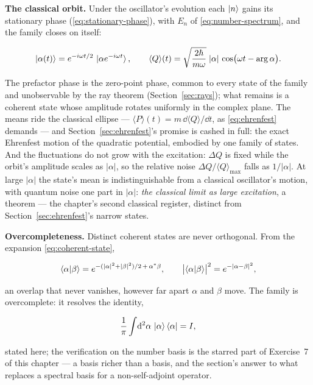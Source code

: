 \textbf{The classical orbit.} Under the oscillator's evolution each $\ket{n}$ gains its stationary phase (\eqref{eq:stationary-phase}), with $E_n$ of \eqref{eq:number-spectrum}, and the family closes on itself:
\begin{linenomath}
    \begin{equation}
        \ket{\alpha(t)} = e^{-i\omega t/2}\,\ket{\alpha e^{-i\omega t}},
        \qquad
        \langle Q\rangle(t) = \sqrt{\frac{2\hbar}{m\omega}}\;|\alpha|\,\cos\bigl(\omega t - \arg\alpha\bigr).
        \label{eq:coherent-evolution}
    \end{equation}
\end{linenomath}
The prefactor phase is the zero-point phase, common to every state of the family and unobservable by the ray theorem (Section~\ref{sec:rays}); what remains is a coherent state whose amplitude rotates uniformly in the complex plane. The means ride the classical ellipse --- $\langle P\rangle(t) = m\,\dd\langle Q\rangle/\dd t$, as \eqref{eq:ehrenfest} demands --- and Section~\ref{sec:ehrenfest}'s promise is cashed in full: the exact Ehrenfest motion of the quadratic potential, embodied by one family of states. And the fluctuations do not grow with the excitation: $\Delta Q$ is fixed while the orbit's amplitude scales as $|\alpha|$, so the relative noise $\Delta Q/\langle Q\rangle_{\max}$ falls as $1/|\alpha|$. At large $|\alpha|$ the state's mean is indistinguishable from a classical oscillator's motion, with quantum noise one part in $|\alpha|$: \emph{the classical limit as large excitation}, a theorem --- the chapter's second classical register, distinct from Section~\ref{sec:ehrenfest}'s narrow states.

\textbf{Overcompleteness.} Distinct coherent states are never orthogonal. From the expansion \eqref{eq:coherent-state},
\begin{linenomath}
    \begin{equation}
        \braket{\alpha|\beta} = e^{-(|\alpha|^2+|\beta|^2)/2 \,+\, \alpha^{*}\beta},
        \qquad
        \bigl|\braket{\alpha|\beta}\bigr|^2 = e^{-|\alpha-\beta|^2},
        \label{eq:coherent-overlap}
    \end{equation}
\end{linenomath}
an overlap that never vanishes, however far apart $\alpha$ and $\beta$ move. The family is overcomplete: it resolves the identity,
\begin{linenomath}
    \begin{equation}
        \frac{1}{\pi}\int\!\mathrm{d}^2\alpha\,\ket{\alpha}\bra{\alpha} = I,
        \label{eq:coherent-resolution}
    \end{equation}
\end{linenomath}
stated here; the verification on the number basis is the starred part of Exercise~7 of this chapter --- a basis richer than a basis, and the section's answer to what replaces a spectral basis for a non-self-adjoint operator.

